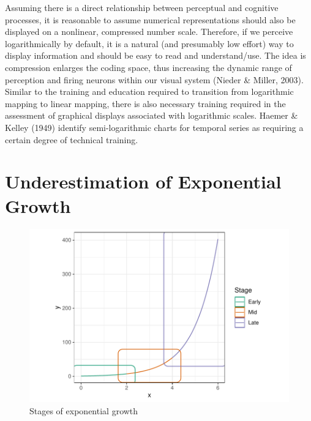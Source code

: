 \documentclass[print]{nuthesis}
\begin{document}
Assuming there is a direct relationship between perceptual and cognitive processes, it is reasonable to assume numerical representations should also be displayed on a nonlinear, compressed number scale. Therefore, if we perceive logarithmically by default, it is a natural (and presumably low effort) way to display information and should be easy to read and understand/use.
The idea is compression enlarges the coding space, thus increasing the dynamic range of perception and firing neurons within our visual system (Nieder \& Miller, 2003).
Similar to the training and education required to transition from logarithmic mapping to linear mapping, there is also necessary training required in the assessment of graphical displays associated with logarithmic scales. Haemer \& Kelley (1949) identify semi-logarithmic charts for temporal series as requiring a certain degree of technical training.

\hypertarget{underestimation}{%
\section{Underestimation of Exponential Growth}\label{underestimation}}


\begin{figure}[tbp]

{\centering \includegraphics[width=0.75\linewidth,]{thesis_files/figure-latex/exponential-stages-1} 

}

\caption{Stages of exponential growth}\label{fig:exponential-stages}
\end{figure}
\end{document}
